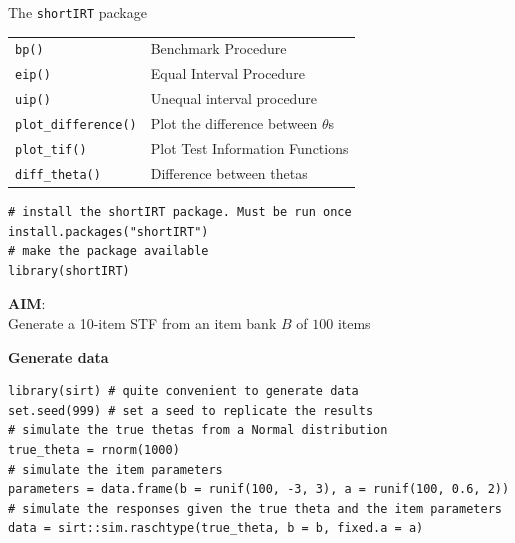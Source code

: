 \documentclass[aspectratio=149, compress]{beamer}
\begin{document}
\begin{frame}[fragile]{The \texttt{shortIRT} package}
	\begin{table}[h]
		\centering
		\begin{tabular}{ll}
			\hline
			\texttt{bp()}               & Benchmark Procedure               \\
			\texttt{eip()}              & Equal Interval Procedure          \\
			\texttt{uip()}              & Unequal interval procedure        \\
			\texttt{plot\_difference()} & Plot the difference between $\theta$s \\
			\texttt{plot\_tif()}        & Plot Test Information Functions   \\

			\texttt{diff\_theta()}      & Difference between thetas         \\\hline
		\end{tabular}
	\end{table}
	
	
	\begin{verbatim}
# install the shortIRT package. Must be run once
install.packages("shortIRT")
# make the package available
library(shortIRT) 
	\end{verbatim}
	
\end{frame}

\begin{frame}[fragile]
	
	\begin{center}
		\textbf{AIM}: \\
		Generate a 10-item STF from an item bank $B$ of $100$ items
	\end{center}
	
	
	\textbf{Generate data}
	
	\footnotesize
	\begin{verbatim}
library(sirt) # quite convenient to generate data
set.seed(999) # set a seed to replicate the results
# simulate the true thetas from a Normal distribution
true_theta = rnorm(1000)
# simulate the item parameters
parameters = data.frame(b = runif(100, -3, 3), a = runif(100, 0.6, 2))
# simulate the responses given the true theta and the item parameters
data = sirt::sim.raschtype(true_theta, b = b, fixed.a = a)
	\end{verbatim}
\end{frame}
\end{document}
